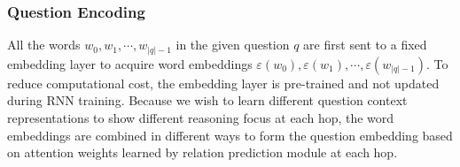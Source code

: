 \subsubsection{Question Encoding} All the words $w_0,w_1,\cdots,w_{|q|-1}$ in the given question $q$ are first sent to a fixed embedding layer to acquire word embeddings $\varepsilon(w_0),\varepsilon(w_1),\cdots,\varepsilon(w_{|q|-1})$.  To reduce computational cost, the embedding layer is pre-trained and not updated during RNN training. Because we wish to learn different question context representations to show different reasoning focus at each hop, the  word embeddings are combined in different ways to form the question embedding  based on attention weights learned by relation prediction module at each hop.




